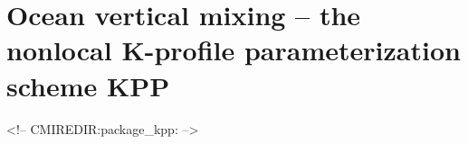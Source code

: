 \section{Ocean vertical mixing -- 
the nonlocal K-profile parameterization scheme KPP}

\label{sec:pkg:kpp}
\begin{rawhtml}
<!-- CMIREDIR:package_kpp: -->
\end{rawhtml}
